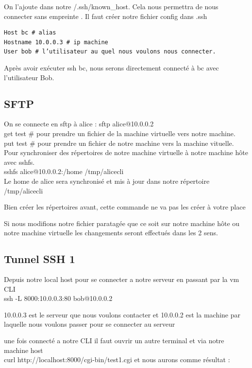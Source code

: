 \documentclass{article}
\begin{document}
\noindent On l'ajoute dans notre /.ssh/known\_host. Cela nous permettra de nous connecter sans empreinte .
Il faut créer notre fichier config dans .ssh
\begin{commandline}
	\begin{verbatim}
Host bc # alias
Hostname 10.0.0.3 # ip machine
User bob # l’utilisateur au quel nous voulons nous connecter.
	\end{verbatim}
\end{commandline}

\noindent Après avoir exécuter ssh bc, nous serons directement connecté à bc avec l'utilisateur Bob.

\subsection{SFTP} %

\noindent On se connecte en sftp à alice : sftp alice@10.0.0.2 
\\
\noindent get test \# pour prendre un fichier de la machine virtuelle vers notre machine.
\\
\noindent put test \# pour prendre un fichier de notre machine vers la machine vituelle.
\\
Pour synchroniser des répertoires de notre machine virtuelle à notre machine hôte avec sshfs.
\\
\noindent sshfs alice@10.0.0.2:/home /tmp/alicecli
\\
Le home de alice sera synchronisé et mis à jour dans notre répertoire /tmp/alicecli

\begin{warn}
Bien créer les répertoires avant, cette commande ne va pas les créer à votre place
\end{warn}

\noindent Si nous modifions notre fichier paratagée que ce soit sur notre machine hôte ou notre machine virtuelle les changements seront effectués dans les 2 sens.

\subsection{Tunnel SSH 1}

\noindent Depuis notre local host pour se connecter a notre serveur en passant par la vm CLI
\\
 ssh -L 8000:10.0.0.3:80 bob@10.0.0.2
\begin{warn}
10.0.0.3 est le serveur que nous voulons contacter et 10.0.0.2 est la machine par laquelle nous voulons passer pour se connecter au serveur
\end{warn}
une fois connecté a notre CLI il faut ouvrir un autre terminal et via notre machine host
\\
curl http://localhost:8000/cgi-bin/test1.cgi et nous aurons comme résultat :
\end{document}
